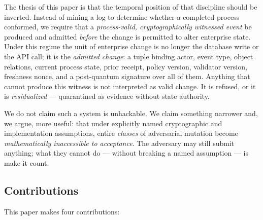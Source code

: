 The thesis of this paper is that the temporal position of that discipline should
be inverted. Instead of mining a log to determine whether a completed process
conformed, we require that a \emph{process-valid, cryptographically witnessed
event} be produced and admitted \emph{before} the change is permitted to alter
enterprise state. Under this regime the unit of enterprise change is no longer
the database write or the API call; it is the \emph{admitted change}: a tuple
binding actor, event type, object relations, current process state, prior
receipt, policy version, validator version, freshness nonce, and a post-quantum
signature over all of them. Anything that cannot produce this witness is not
interpreted as valid change. It is refused, or it is \emph{residualized} ---
quarantined as evidence without state authority.

We do not claim such a system is unhackable. We claim something narrower and,
we argue, more useful: that under explicitly named cryptographic and
implementation assumptions, entire \emph{classes} of adversarial mutation become
\emph{mathematically inaccessible to acceptance}. The adversary may still submit
anything; what they cannot do --- without breaking a named assumption --- is make
it count.

\subsection{Contributions}

This paper makes four contributions:

